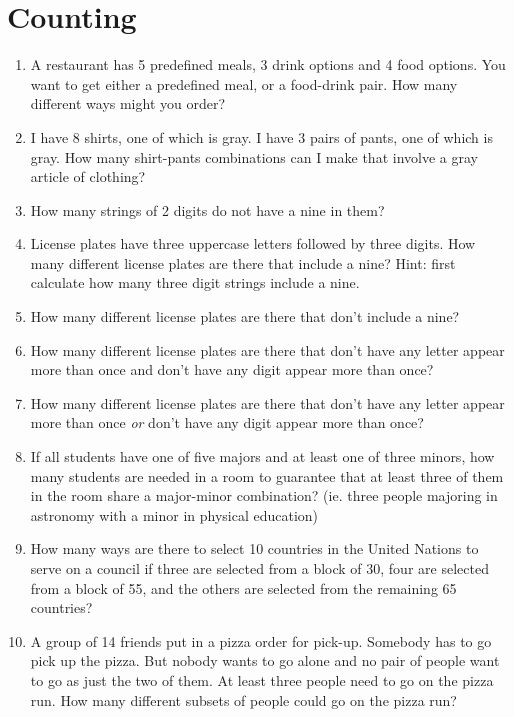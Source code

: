 \documentclass{article}
\begin{document}
\section{Counting}
\begin{enumerate}
\item A restaurant has 5 predefined meals, 3 drink options and 4 food options. You want to get either a predefined meal, or a food-drink pair. How many different ways might you order?

\item I have 8 shirts, one of which is gray. I have 3 pairs of pants, one of which is gray. How many shirt-pants combinations can I make that involve a gray article of clothing?

\item How many strings of 2 digits do not have a nine in them?

\item License plates have three uppercase letters followed by three digits. How many different license plates are there that include a nine? Hint: first calculate how many three digit strings include a nine.

\item How many different license plates are there that don't include a nine?

\item How many different license plates are there that don't have any letter appear more than once and don't have any digit appear more than once?

\item How many different license plates are there that don't have any letter appear more than once \textit{or} don't have any digit appear more than once?

\item If all students have one of five majors and at least one of three minors, how many students are needed in a room to guarantee that at least three of them in the room share a major-minor combination? (ie. three people majoring in astronomy with a minor in physical education)

\item How many ways are there to select 10 countries in the United Nations to serve on a council if three are selected from a block of 30, four are selected from a block of 55, and the others are selected from the remaining 65 countries?

\item A group of 14 friends put in a pizza order for pick-up. Somebody has to go pick up the pizza. But nobody wants to go alone and no pair of people want to go as just the two of them. At least three people need to go on the pizza run. How many different subsets of people could go on the pizza run?


\end{enumerate}
\end{document}
